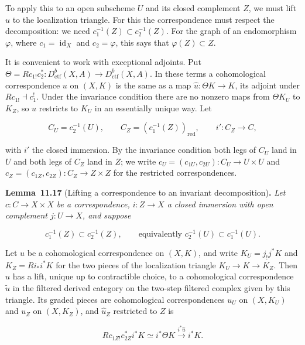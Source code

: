 \documentclass[11pt]{article}
\newenvironment{bpstatement}[2]{\par\addvspace{0.6\baselineskip}\noindent\textbf{#1}#2\textbf{.}\enspace\ignorespaces}
  {\par\addvspace{0.4\baselineskip}}
\newenvironment{bpstatementit}[2]{\begin{bpstatement}{#1}{#2}\itshape\ignorespaces}{\end{bpstatement}}
\begin{document}
\label{bp47}%
To apply this to an open subscheme \(U\) and its closed complement \(Z\), we must lift \(u\) to the localization triangle. For this the correspondence must respect the decomposition: we need \(c_1^{-1}(Z)\subset c_2^{-1}(Z)\). For the graph of an endomorphism \(\varphi\), where \(c_1=\operatorname{id}_X\) and \(c_2=\varphi\), this says that \(\varphi(Z)\subset Z\).

It is convenient to work with exceptional adjoints. Put \(\Theta=Rc_{1!}c_2^*:D^b_{\mathrm{ctf}}(X,A)\to D^b_{\mathrm{ctf}}(X,A)\). In these terms a cohomological correspondence \(u\) on \((X,K)\) is the same as a map \(\widehat u:\Theta K\to K\), its adjoint under \(Rc_{1!}\dashv c_1^!\). Under the invariance condition there are no nonzero maps from \(\Theta K_U\) to \(K_Z\), so \(u\) restricts to \(K_U\) in an essentially unique way. Let

\[
C_U=c_2^{-1}(U),\qquad C_Z=(c_1^{-1}(Z))_{\mathrm{red}},\qquad
i':C_Z\longrightarrow C,
\]

with \(i'\) the closed immersion. By the invariance condition both legs of \(C_U\) land in \(U\) and both legs of \(C_Z\) land in \(Z\); we write \(c_U=(c_{1U},c_{2U}):C_U\to U\times U\) and \(c_Z=(c_{1Z},c_{2Z}):C_Z\to Z\times Z\) for the restricted correspondences.

\label{bp48}%
\begin{bpstatementit}{Lemma~11.17}{ (Lifting a correspondence to an invariant decomposition)}
Let \(c:C\to X\times X\) be a correspondence, \(i:Z\to X\) a closed immersion with open complement \(j:U\to X\), and suppose

\[
c_1^{-1}(Z)\subset c_2^{-1}(Z),
\qquad\text{equivalently }c_2^{-1}(U)\subset c_1^{-1}(U).
\]

Let \(u\) be a cohomological correspondence on \((X,K)\), and write \(K_U=j_!j^*K\) and \(K_Z=Ri_*i^*K\) for the two pieces of the localization triangle \(K_U\to K\to K_Z\). Then \(u\) has a lift, unique up to contractible choice, to a cohomological correspondence \(\tilde u\) in the filtered derived category on the two-step filtered complex given by this triangle. Its graded pieces are cohomological correspondences \(u_U\) on \((X,K_U)\) and \(u_Z\) on \((X,K_Z)\), and \(\widehat u_Z\) restricted to \(Z\) is

\[
Rc_{1Z!}c_{2Z}^*i^*K\simeq i^*\Theta K
\xrightarrow{i^*\widehat u}i^*K.
\]
\end{bpstatementit}
\end{document}

